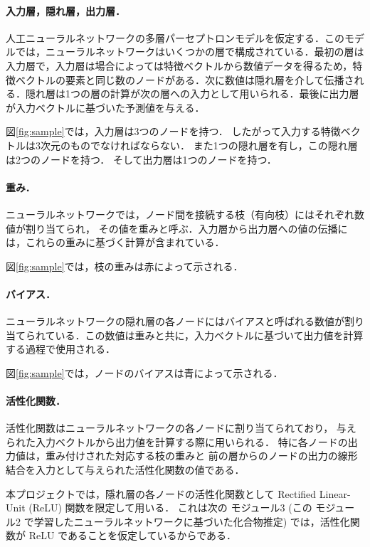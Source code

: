 \documentclass[11pt,titlepage,dvipdfmx,twoside]{jsbook}
\newcommand{\figref}[1]{図\ref{fig:#1}}
\begin{document}
\paragraph{入力層，隠れ層，出力層．}
人工ニューラルネットワークの多層パーセプトロンモデルを仮定する．このモデルでは，ニューラルネットワークはいくつかの層で構成されている．最初の層は入力層で，入力層は場合によっては特徴ベクトルから数値データを得るため，特徴ベクトルの要素と同じ数のノードがある．次に数値は隠れ層を介して伝播される．隠れ層は1つの層の計算が次の層への入力として用いられる．最後に出力層が入力ベクトルに基づいた予測値を与える．

\figref{sample}では，入力層は3つのノードを持つ．
したがって入力する特徴ベクトルは3次元のものでなければならない．
また1つの隠れ層を有し，この隠れ層は2つのノードを持つ．
そして出力層は1つのノードを持つ．

\paragraph{重み．}
ニューラルネットワークでは，ノード間を接続する枝（有向枝）にはそれぞれ数値が割り当てられ，
その値を重みと呼ぶ．入力層から出力層への値の伝播には，これらの重みに基づく計算が含まれている．

\figref{sample}では，枝の重みは赤によって示される．


\paragraph{バイアス．}
ニューラルネットワークの隠れ層の各ノードにはバイアスと呼ばれる数値が割り当てられている．この数値は重みと共に，入力ベクトルに基づいて出力値を計算する過程で使用される．

\figref{sample}では，ノードのバイアスは青によって示される．

\paragraph{活性化関数．}
活性化関数はニューラルネットワークの各ノードに割り当てられており，
与えられた入力ベクトルから出力値を計算する際に用いられる．
特に各ノードの出力値は，重み付けされた対応する枝の重みと
前の層からのノードの出力の線形結合を入力として与えられた活性化関数の値である．

本プロジェクトでは，隱れ層の各ノードの活性化関数として
Rectified Linear-Unit (ReLU) 関数を限定して用いる．
これは次の モジュール3 (この モジュール2 で学習したニューラルネットワークに基づいた化合物推定)
では，活性化関数が ReLU であることを仮定しているからである． 
\end{document}
